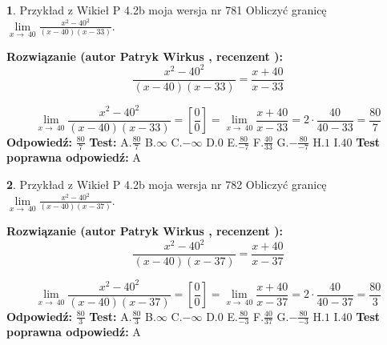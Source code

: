 \documentclass[12pt, a4paper]{article}
\theoremstyle{definition} %
\newtheorem{zad}{}
\newcommand{\zadStart}[1]{\begin{zad}#1\newline}
\newcommand{\zadStop}{\end{zad}}
\newcommand{\rozwStart}[2]{\noindent \textbf{Rozwiązanie (autor #1 , recenzent #2): }\newline}
\newcommand{\rozwStop}{\newline}
\newcommand{\odpStart}{\noindent \textbf{Odpowiedź:}\newline}
\newcommand{\odpStop}{\newline}
\newcommand{\testStart}{\noindent \textbf{Test:}\newline}
\newcommand{\testStop}{\newline}
\newcommand{\kluczStart}{\noindent \textbf{Test poprawna odpowiedź:}\newline}
\newcommand{\kluczStop}{\newline}
\begin{document}
\zadStart{Przykład z Wikieł P 4.2b moja wersja nr 781}
Obliczyć granicę $\lim\limits_{x\to\ 40}\frac{x^{2}-40^{2}}{(x-40)(x-33)}$.
\zadStop
\rozwStart{Patryk Wirkus}{}
$$\frac{x^{2}-40^{2}}{(x-40)(x-33)}=\frac{x+40}{x-33}$$

$$\lim\limits_{x\to\ 40}\frac{x^{2}-40^{2}}{(x-40)(x-33)}=[\frac{0}{0}]=\lim\limits_{x\to\ 40}\frac{x+40}{x-33}=2 \cdot \frac{40}{40-33} = \frac{80}{7}$$
\rozwStop
\odpStart
$\frac{80}{7}$
\odpStop
\testStart
A.$\frac{80}{7}$
B.$\infty$
C.$-\infty$
D.$0$
E.$\frac{80}{-7}$
F.$\frac{40}{33}$
G.$-\frac{80}{-7}$
H.$1$
I.$40$
\testStop
\kluczStart
A
\kluczStop



\zadStart{Przykład z Wikieł P 4.2b moja wersja nr 782}
Obliczyć granicę $\lim\limits_{x\to\ 40}\frac{x^{2}-40^{2}}{(x-40)(x-37)}$.
\zadStop
\rozwStart{Patryk Wirkus}{}
$$\frac{x^{2}-40^{2}}{(x-40)(x-37)}=\frac{x+40}{x-37}$$

$$\lim\limits_{x\to\ 40}\frac{x^{2}-40^{2}}{(x-40)(x-37)}=[\frac{0}{0}]=\lim\limits_{x\to\ 40}\frac{x+40}{x-37}=2 \cdot \frac{40}{40-37} = \frac{80}{3}$$
\rozwStop
\odpStart
$\frac{80}{3}$
\odpStop
\testStart
A.$\frac{80}{3}$
B.$\infty$
C.$-\infty$
D.$0$
E.$\frac{80}{-3}$
F.$\frac{40}{37}$
G.$-\frac{80}{-3}$
H.$1$
I.$40$
\testStop
\kluczStart
A
\kluczStop
\end{document}
